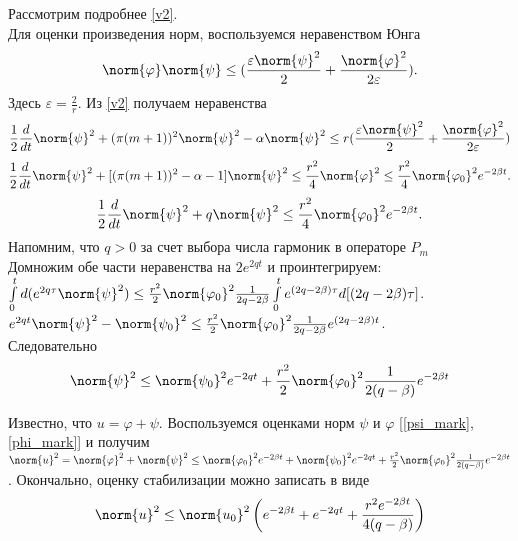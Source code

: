 Рассмотрим подробнее \eqref{v2}.\\
Для оценки произведения норм, воспользуемся неравенством Юнга
\begin{equation*}
	\norm{\varphi} \norm{\psi} \le (\frac{\varepsilon \norm{\psi}^2}{2} + \frac{\norm{\varphi}^2}{2 \varepsilon}).
\end{equation*}
Здесь $\varepsilon = \frac{2}{r}$. Из \eqref{v2} получаем неравенства \\
\begin{equation*}
	\frac{1}{2} \frac{d}{dt} \norm{\psi}^2 + (\pi(m + 1))^2 \norm{\psi}^2 - \alpha \norm{\psi}^2 \le r (\frac{\varepsilon \norm{\psi}^2}{2} + \frac{\norm{\varphi}^2}{2 \varepsilon})
\end{equation*}
\begin{equation*}
	\frac{1}{2} \frac{d}{dt} \norm{\psi}^2  + [(\pi(m + 1))^2 - \alpha - 1] \norm{\psi}^2 \le \frac{r^2}{4}\norm{\varphi}^2 \le \frac{r^2}{4}\norm{\varphi_0}^2 e^{-2\beta t}.
\end{equation*}
\begin{equation}
	\frac{1}{2} \frac{d}{dt} \norm{\psi}^2 + q\norm{\psi}^2 \le \frac{r^2}{4}\norm{\varphi_0}^2 e^{-2\beta t}.
\end{equation}
Напомним, что $q > 0$ за счет выбора числа гармоник в операторе $P_m$\\
Домножим обе части неравенства на $2e^{2qt}$ и проинтегрируем: \\
$\int\limits_0^t{d(e^{2q\tau}} \norm{\psi}^2) \le \frac{r^2}{2} \norm{\varphi_0}^2 \frac{1}{2q - 2\beta} \int\limits_0^t {e^{(2q -2\beta) \tau} d[(2q -2\beta) \tau]}$.\\
$e^{2qt} \norm{\psi}^2 - \norm{\psi_0}^2 \le \frac{r^2}{2} \norm{\varphi_0}^2 \frac{1}{2q - 2\beta} e^{(2q -2\beta)t}$.\\
Следовательно 
\begin{equation}\label{psi_mark}
	\norm{\psi}^2 \le \norm{\psi_0}^2 e^{-2qt} + \frac{r^2}{2} \norm{\varphi_0}^2 \frac{1}{2(q - \beta)} e^{-2\beta t}
\end{equation}

Известно, что $u = \varphi + \psi$. Воспользуемся оценками норм $\psi$ и $\varphi$ [\eqref{psi_mark}, \eqref{phi_mark}] и получим\\
$\norm{u}^2 = \norm{\varphi}^2 + \norm{\psi}^2 \le \norm{\varphi_0}^2 e^{-2\beta t} + \norm{\psi_0}^2 e^{-2qt} + \frac{r^2}{2} \norm{\varphi_0}^2 \frac{1}{2(q - \beta)} e^{-2\beta t}$.
Окончально, оценку стабилизации можно записать в виде
\begin{equation}
	\norm{u}^2 \le \norm{u_0}^2 \left( e^{-2\beta t} + e^{-2qt} + \frac{r^2 e^{-2\beta t}}{4(q - \beta)} \right)
\end{equation}
